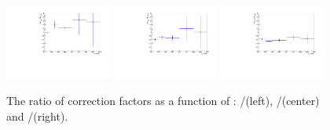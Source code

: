 \begin{figure}[!h]
  \centering
  \includegraphics[width=0.31\textwidth]{figures/sidebandCorr/SFDR_w_z}
  \includegraphics[width=0.31\textwidth]{figures/sidebandCorr/SFDR_tt_z}
  \includegraphics[width=0.31\textwidth]{figures/sidebandCorr/SFDR_tt_w}
  \caption{The ratio of correction factors as a function of \scalht: \wj/\zj (left), \ttj/\zj (center) and \ttj/\wj (right).}
  \label{fig:double_ratios}
\end{figure}


